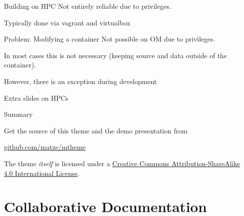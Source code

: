 \documentclass[10pt]{beamer}              %
\begin{document}
\begin{frame}{Building on HPC}
Not entirely reliable due to privileges. 

Typically done via vagrant and virtualbox

\end{frame}




\begin{frame}{Problem: Modifying a container}
    Not possible on OM due to privileges.
    
    In most cases this is not necessary (keeping source and data outside of the container).
    
    However, there is an exception during development
\end{frame}




{
\begin{frame}[standout]
  Extra slides on HPCs
\end{frame}
}

\appendix
\begin{frame}{Summary}

  Get the source of this theme and the demo presentation from

  \begin{center}\url{github.com/matze/mtheme}\end{center}

  The theme \emph{itself} is licensed under a
  \href{http://creativecommons.org/licenses/by-sa/4.0/}{Creative Commons
  Attribution-ShareAlike 4.0 International License}.

  \begin{center}\ccbysa\end{center}

\end{frame}

\section{Collaborative Documentation}
\end{document}
